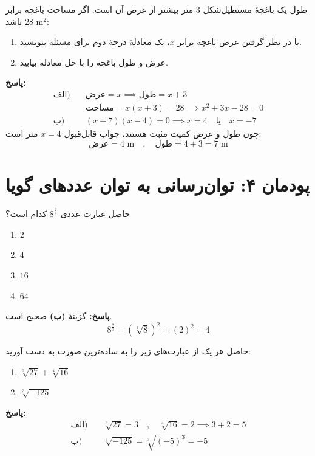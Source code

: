 \documentclass[a4paper,12pt]{article}
\begin{document}
\begin{tcolorbox}[title=\textbf{سؤال ۹ (تشریحی)}]
طول یک باغچۀ مستطیل‌شکل $3$ متر بیشتر از عرض آن است. اگر مساحت باغچه برابر $28\text{ m}^2$ باشد:
\begin{enumerate}[label=\textbf{\alph*)}]
    \item با در نظر گرفتن عرض باغچه برابر $x$، یک معادلۀ درجۀ دوم برای مسئله بنویسید.
    \item عرض و طول باغچه را با حل معادله بیابید.
\end{enumerate}
\textbf{پاسخ:}
\begin{align*}
\text{الف)} \quad & \text{عرض} = x \implies \text{طول} = x + 3 \\
& \text{مساحت} = x(x + 3) = 28 \implies x^2 + 3x - 28 = 0 \\
\text{ب)} \quad & (x + 7)(x - 4) = 0 \implies x = 4 \quad \text{یا} \quad x = -7
\end{align*}
چون طول و عرض کمیت مثبت هستند، جواب قابل‌قبول $x = 4$ متر است:
\[ \text{عرض} = 4 \text{ m} \quad , \quad \text{طول} = 4 + 3 = 7 \text{ m} \]
\end{tcolorbox}

\newpage

\section*{پودمان ۴: توان‌رسانی به توان عددهای گویا}

\begin{tcolorbox}[title=\textbf{سؤال ۱۰ (تستی)}]
حاصل عبارت عددی $8^{\frac{2}{3}}$ کدام است؟
\begin{enumerate}[label=\textbf{(\alph*)}]
    \item $2$
    \item $4$
    \item $16$
    \item $64$
\end{enumerate}
\textbf{پاسخ:} گزینۀ \textbf{(ب)} صحیح است.
\[ 8^{\frac{2}{3}} = \left(\sqrt[3]{8}\right)^2 = (2)^2 = 4 \]
\end{tcolorbox}

\begin{tcolorbox}[title=\textbf{سؤال ۱۱ (تشریحی)}]
حاصل هر یک از عبارت‌های زیر را به ساده‌ترین صورت به دست آورید:
\begin{enumerate}[label=\textbf{\alph*)}]
    \item $\sqrt[3]{27} + \sqrt[4]{16}$
    \item $\sqrt[3]{-125}$
\end{enumerate}
\textbf{پاسخ:}
\begin{align*}
\text{الف)} \quad & \sqrt[3]{27} = 3 \quad , \quad \sqrt[4]{16} = 2 \implies 3 + 2 = 5 \\
\text{ب)} \quad & \sqrt[3]{-125} = \sqrt[3]{(-5)^3} = -5
\end{align*}
\end{tcolorbox}
\end{document}
